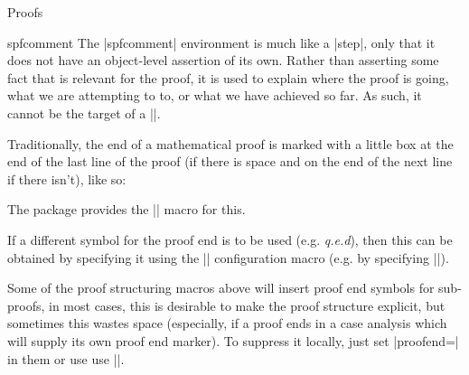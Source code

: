 \begin{sfragment}{Proofs}
\begin{environment}{spfcomment}
  The |spfcomment| environment is much like a |step|, only that it does not have an
  object-level assertion of its own. Rather than asserting some fact that is relevant
  for the proof, it is used to explain where the proof is going, what we are attempting
  to to, or what we have achieved so far. As such, it cannot be the target of a
  |\premise|.
\end{environment}

\begin{function}{\sproofend}
  Traditionally, the end of a mathematical proof is marked with a little box at the end of
  the last line of the proof (if there is space and on the end of the next line if there
  isn't), like so:\sproofend

  The  package provides the |\sproofend| macro for this.
\end{function}
  
\begin{variable}{\sProofEndSymbol}
  If a different symbol for the proof end is to be used (e.g. {\sl{q.e.d}}), then this can
  be obtained by specifying it using the |\sProofEndSymbol| configuration macro (e.g. by
  specifying ||).
\end{variable}
  
Some of the proof structuring macros above will insert proof end symbols for sub-proofs,
in most cases, this is desirable to make the proof structure explicit, but sometimes this
wastes space (especially, if a proof ends in a case analysis which will supply its own
proof end marker). To suppress it locally, just set |proofend={}| in them or use use
|\sProofEndSymbol{}|.
\end{sfragment}


